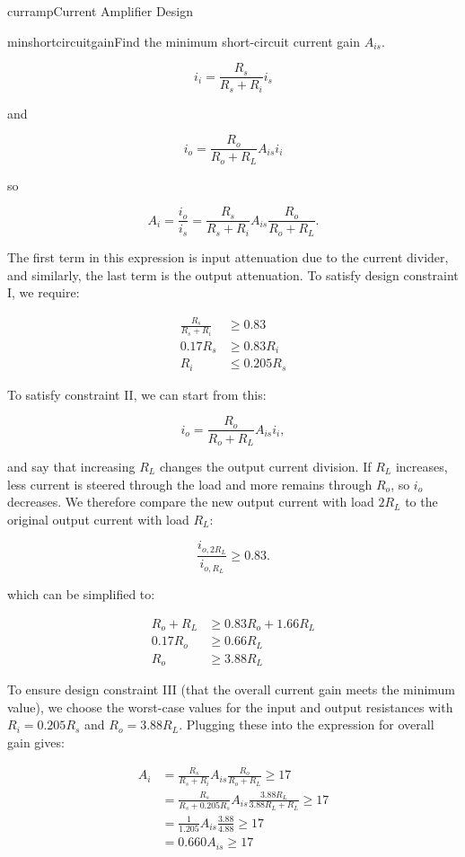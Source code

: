 \begin{mainquestion}{curramp}{Current Amplifier Design}
\begin{partquestion}{minshortcircuitgain}{Find the minimum short-circuit current gain $A_{is}$.}
\begin{answer}
    

\[
i_{i} = \frac{R_{s}}{R_{s} + R_{i}} i_{s}
\]

and

\[
i_{o} = \frac{R_{o}}{R_{o} + R_{L}} A_{is} i_{i}
\]

so

\[
A_{i} = \frac{i_{o}}{i_{s}} = \frac{R_{s}}{R_{s} + R_{i}} A_{is} \frac{R_{o}}{R_{o} + R_{L}}.
\]

The first term in this expression is input attenuation due to the current divider, and similarly, the last term is the output attenuation. To satisfy design constraint I, we require:

\begin{align*}
    \frac{R_s}{R_s + R_i} &\geq 0.83 \\
    0.17 R_s &\geq 0.83 R_i \\
    R_i &\leq 0.205R_s
\end{align*}

\begin{kaitlyn}

To satisfy constraint II, we can start from this:

\[i_o =\frac{R_o}{R_o+R_L}A_{is}i_i,\]

and say that increasing $R_L$ changes the output current division. If $R_L$ increases, less current is steered through the load and more remains through $R_o$, so $i_o$ decreases. We therefore compare the new output current with load $2R_L$ to the original output current with load $R_L$:

\[\frac{i_{o,2R_L}}{i_{o,R_L}} \geq 0.83.\]
    
\end{kaitlyn}

which can be simplified to:

\begin{align*}
    R_o + R_L &\geq 0.83R_o + 1.66R_L \\
    0.17 R_o &\geq 0.66 R_L \\
    R_o &\geq 3.88 R_L
\end{align*}

To ensure design constraint III (that the overall current gain meets the minimum value), we choose the worst-case values for the input and output resistances with $R_{i} = 0.205 R_{s}$ and $R_{o} = 3.88 R_{L}$. Plugging these into the expression for overall gain gives:

\begin{align*}
A_i &= \frac{R_s}{R_s + R_i} A_{is} \frac{R_o}{R_o + R_L} \geq 17 \\
&= \frac{R_s}{R_s + 0.205 R_s} A_{is} \frac{3.88 R_L}{3.88 R_L + R_L} \geq 17 \\
&= \frac{1}{1.205}A_{is} \frac{3.88}{4.88} \geq 17 \\
&= 0.660 A_{is} \geq 17
\end{align*}


\end{answer}
\end{partquestion}
\end{mainquestion}
